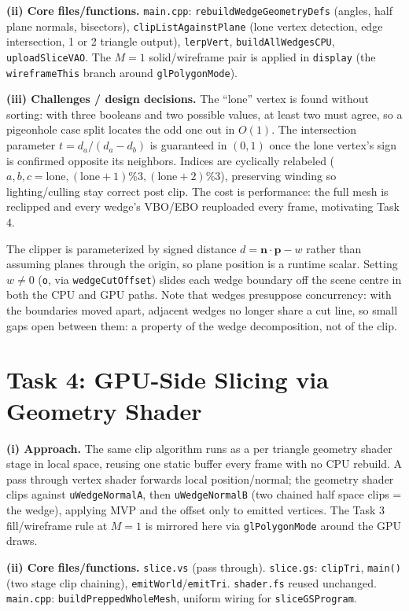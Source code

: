 \documentclass[10pt]{article}
\begin{document}
\textbf{(ii) Core files/functions.} \texttt{main.cpp}: \texttt{rebuildWedgeGeometryDefs}
(angles, half plane normals, bisectors), \texttt{clipListAgainstPlane} (lone vertex
detection, edge intersection, 1 or 2 triangle output), \texttt{lerpVert},
\texttt{buildAllWedgesCPU}, \texttt{uploadSliceVAO}. The $M=1$ solid/wireframe pair
is applied in \texttt{display} (the \texttt{wireframeThis} branch around
\texttt{glPolygonMode}).

\textbf{(iii) Challenges / design decisions.} The ``lone'' vertex is found without 
sorting: with three booleans and two possible values, at least two must agree, 
so a pigeonhole case split locates the odd one out in $O(1)$. The 
intersection parameter $t=d_a/(d_a-d_b)$ is guaranteed in $(0,1)$ once the 
lone vertex's sign is confirmed opposite its neighbors. Indices are cyclically relabeled 
($a,b,c=\text{lone},(\text{lone}{+}1)\%3,(\text{lone}{+}2)\%3$), preserving 
winding so lighting/culling stay correct post clip. The cost is performance: 
the full mesh is reclipped and every wedge's VBO/EBO reuploaded every frame, 
motivating Task 4.

The clipper is parameterized by signed distance $d = \mathbf{n}\cdot\mathbf{p} - w$
rather than assuming planes through the origin, so plane position is a runtime
scalar. Setting $w \neq 0$ (\texttt{o}, via \texttt{wedgeCutOffset}) slides each
wedge boundary off the scene centre in both the CPU and GPU paths. Note that 
wedges presuppose concurrency: with the boundaries moved apart,
adjacent wedges no longer share a cut line, so small gaps open between them: a
property of the wedge decomposition, not of the clip.


\section{Task 4: GPU-Side Slicing via Geometry Shader}
\textbf{(i) Approach.} The same clip algorithm runs as a 
per triangle geometry shader stage in local space, 
reusing one static buffer every frame with no CPU rebuild. 
A pass through vertex shader forwards local position/normal; 
the geometry shader clips against \texttt{uWedgeNormalA}, 
then \texttt{uWedgeNormalB} (two chained half space clips = the wedge), 
applying MVP and the offset only to emitted vertices. 
The Task 3 fill/wireframe rule at $M=1$ is 
mirrored here via \texttt{glPolygonMode} around the GPU draws.


\textbf{(ii) Core files/functions.} \texttt{slice.vs} (pass through). 
\texttt{slice.gs}: \texttt{clipTri}, \texttt{main()} (two stage clip chaining), 
\texttt{emitWorld}/\texttt{emitTri}. \texttt{shader.fs} reused unchanged. 
\texttt{main.cpp}: \texttt{buildPreppedWholeMesh}, uniform wiring for \texttt{sliceGSProgram}.
\end{document}
